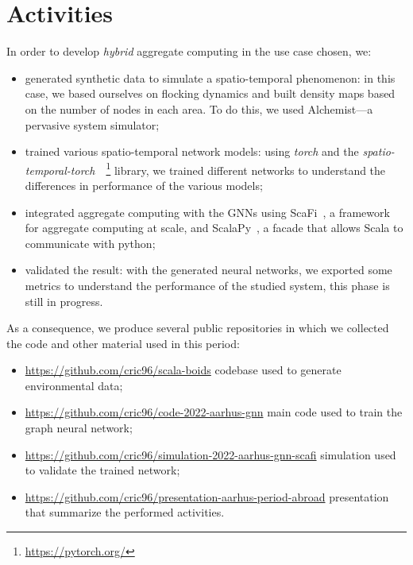 \documentclass{article}
\begin{document}
\section{Activities}
In order to develop \emph{hybrid} aggregate computing in the use case chosen, we:
\begin{itemize}
\item generated synthetic data to simulate a spatio-temporal phenomenon: in this case, we based ourselves on flocking dynamics and built density maps based on the number of nodes in each area. To do this, we used Alchemist---a pervasive system simulator;
\item trained various spatio-temporal network models: using \emph{torch} and the \emph{spatio-temporal-torch}~\cite{rozemberczki2021pytorch}~\footnote{\url{https://pytorch.org/}} library, we trained different networks to understand the differences in performance of the various models;
\item integrated aggregate computing with the GNNs using ScaFi~\cite{casadei2022scafi}, a framework for aggregate computing at scale, and ScalaPy~\cite{laddad2020scalapy}, a facade that allows Scala to communicate with python;
\item validated the result: with the generated neural networks, we exported some metrics to understand the performance of the studied system, this phase is still in progress.
\end{itemize}
As a consequence, we produce several public repositories in which we collected the code and other material used in this period:
\begin{itemize}
\item \url{https://github.com/cric96/scala-boids} codebase used to generate environmental data;
\item \url{https://github.com/cric96/code-2022-aarhus-gnn} main code used to train the graph neural network;
\item \url{https://github.com/cric96/simulation-2022-aarhus-gnn-scafi} simulation used to validate the trained network;
\item \url{https://github.com/cric96/presentation-aarhus-period-abroad} presentation that summarize the performed activities.
\end{itemize}
\end{document}
